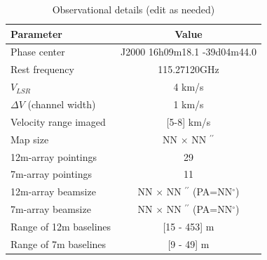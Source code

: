 \documentclass[12pt,a4paper]{article}
\begin{document}
\begin{table}[!hbt]
\caption{Observational details (edit as needed)}\label{fig:aboutdata}              %
\label{table:1}      %
\centering                                      %
\begin{tabular}{l c }          %
\hline\hline                        %
Parameter & Value  \\    %
\hline                                   %
Phase center & J2000 16h09m18.1 -39d04m44.0 \\      %
Rest frequency & 115.27120GHz \\
$V_{LSR}$ & 4 km/s \\
$\Delta V$ (channel width) & 1 km/s \\
Velocity range imaged & [5-8] km/s \\
Map size & NN $\times$ NN $^{\prime\prime}$\\
12m-array pointings & 29\\
7m-array pointings & 11\\
12m-array beamsize & NN $\times$ NN $^{\prime\prime}$ (PA=NN$^{\circ}$)\\
7m-array beamsize & NN $\times$ NN $^{\prime\prime}$ (PA=NN$^{\circ}$)\\
Range of 12m baselines & [15 - 453] m\\
Range of 7m baselines & [9 - 49] m\\
\hline                                             %
\end{tabular}
\end{table}
\end{document}
